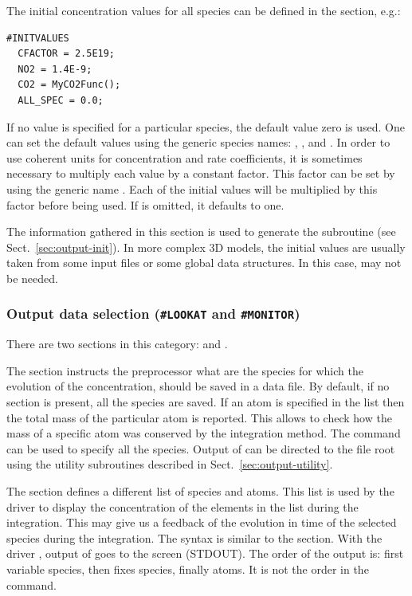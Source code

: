 \documentclass[twoside]{article}
\newcommand{\kpproot}{{\sc root}}
\begin{document}
The initial concentration values for all species can be defined in the
 section, e.g.:
%
\begin{verbatim}
#INITVALUES
  CFACTOR = 2.5E19;
  NO2 = 1.4E-9;
  CO2 = MyCO2Func();
  ALL_SPEC = 0.0;
\end{verbatim}
%
If no value is specified for a particular species, the default value
zero is used. One can set the default values using the generic species
names: , , and . In order
to use coherent units for concentration and rate coefficients, it is
sometimes necessary to multiply each value by a constant factor. This
factor can be set by using the generic name . Each of the
initial values will be multiplied by this factor before being used. If
 is omitted, it defaults to one.

The information gathered in this section is used to generate the
 subroutine (see Sect.~\ref{sec:output-init}). In more
complex 3D models, the initial values are usually taken from some input
files or some global data structures. In this case, 
may not be needed.

\subsubsection{Output data selection ({\tt\#LOOKAT} and {\tt\#MONITOR})}
\label{sec:section-lookat-monitor}

There are two sections in this category:  and
.

The  section instructs the preprocessor what are the
species for which the evolution of the concentration, should be saved in
a data file. By default, if no  section is present, all
the species are saved. If an atom is specified in the 
list then the total mass of the particular atom is reported. This allows
to check how the mass of a specific atom was conserved by the
integration method. The  command can be used to specify
all the species. Output of  can be directed to the file
\kpproot{} using the utility subroutines described in
Sect.~\ref{sec:output-utility}.

The  section defines a different list of species and
atoms. This list is used by the driver to display the concentration of
the elements in the list during the integration. This may give us a
feedback of the evolution in time of the selected species during the
integration. The syntax is similar to the  section. With
the driver , output of  goes to the screen
(STDOUT). The order of the output is: first variable species, then fixes
species, finally atoms. It is not the order in the 
command.
\end{document}
